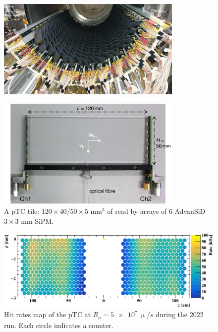 \begin{refsection}
        \begin{figure}
            \centering
            \includegraphics[width = 0.8\textwidth]{Figures/MEG/pTC.png}
            \caption{}
            \label{fig:MEGII:pTC}
        \end{figure}

        \begin{figure}
            \centering
            \includegraphics[width = 0.8\textwidth]{Figures/MEG/pTC_tile.png}
            \caption{A pTC tile: $120\times40/50\times5$ mm$^3$ of  read by arrays of 6 AdvanSiD $3\times3$ mm SiPM.}
            \label{fig:MEGII:pTC:tile}
        \end{figure}

        \begin{figure}
            \centering
            \includegraphics[width = \textwidth]{Figures/MEG/pTC_rate.png}
            \caption{Hit rates map of the pTC at $R_\upmu = \SI{5e7}{\upmu \per s}$ during the 2022 run. Each circle indicates a counter.}
            \label{fig:MEGII:pTC:rate}
        \end{figure}
        

\end{refsection}

